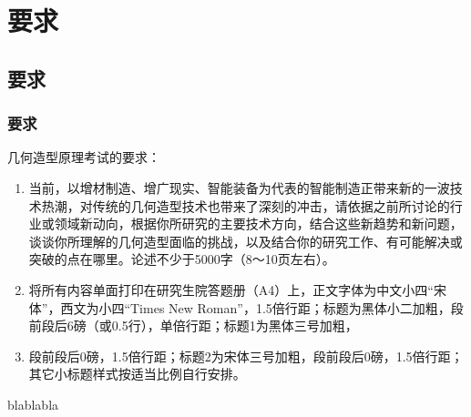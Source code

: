 \section{要求}

\subsection{要求}

\subsubsection{要求}

几何造型原理考试的要求：

\begin{enumerate}
	\item 当前，以增材制造、增广现实、智能装备为代表的智能制造正带来新的一波技术热潮，对传统的几何造型技术也带来了深刻的冲击，请依据之前所讨论的行业或领域新动向，根据你所研究的主要技术方向，结合这些新趋势和新问题，谈谈你所理解的几何造型面临的挑战，以及结合你的研究工作、有可能解决或突破的点在哪里。论述不少于5000字（8～10页左右）。
	
	\item 将所有内容单面打印在研究生院答题册（A4）上，正文字体为中文小四“宋体”，西文为小四“Times New Roman”，1.5倍行距；标题为黑体小二加粗，段前段后6磅（或0.5行），单倍行距；标题1为黑体三号加粗，
	
	\item 段前段后0磅，1.5倍行距；标题2为宋体三号加粗，段前段后0磅，1.5倍行距；其它小标题样式按适当比例自行安排。
\end{enumerate}

blablabla